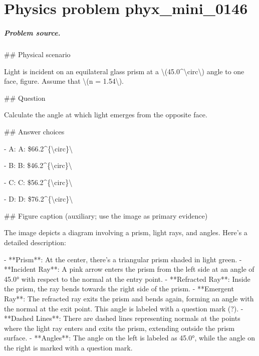
\chapter{Physics problem phyx\_mini\_0146}
\label{ch:PhyXMiniProblems_problem_phyx_mini_0146}

\paragraph{Problem source.}
\#\# Physical scenario

Light is incident on an equilateral glass prism at a \textbackslash{}(45.0\textasciicircum{}\textbackslash{}circ\textbackslash{}) angle to one face, figure. Assume that \textbackslash{}(n = 1.54\textbackslash{}).

\#\# Question

Calculate the angle at which light emerges from the opposite face.

\#\# Answer choices

- A: A: \$66.2\textasciicircum{}\{\textbackslash{}circ\}\textbackslash{}

- B: B: \$46.2\textasciicircum{}\{\textbackslash{}circ\}\textbackslash{}

- C: C: \$56.2\textasciicircum{}\{\textbackslash{}circ\}\textbackslash{}

- D: D: \$76.2\textasciicircum{}\{\textbackslash{}circ\}\textbackslash{}

\#\# Figure caption (auxiliary; use the image as primary evidence)

The image depicts a diagram involving a prism, light rays, and angles. Here's a detailed description:

- **Prism**: At the center, there's a triangular prism shaded in light green.
- **Incident Ray**: A pink arrow enters the prism from the left side at an angle of 45.0° with respect to the normal at the entry point.
- **Refracted Ray**: Inside the prism, the ray bends towards the right side of the prism.
- **Emergent Ray**: The refracted ray exits the prism and bends again, forming an angle with the normal at the exit point. This angle is labeled with a question mark (?).
- **Dashed Lines**: There are dashed lines representing normals at the points where the light ray enters and exits the prism, extending outside the prism surface.
- **Angles**: The angle on the left is labeled as 45.0°, while the angle on the right is marked with a question mark.

